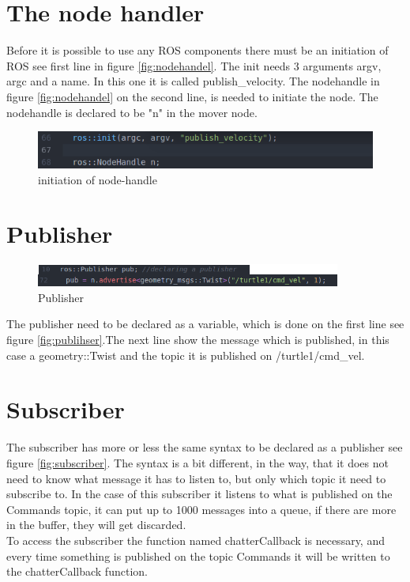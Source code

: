 \section{The node handler}
Before it is possible to use any ROS components there must be an initiation of ROS see first line in figure \ref{fig:nodehandel}. The init needs 3 arguments argv, argc and a name. In this one it is called publish\_velocity. The nodehandle in figure \ref{fig:nodehandel} on the second line, is needed to initiate the node. The nodehandle is declared to be "n" in the mover node.\\
\begin{figure}[h]
\begin{center}
\includegraphics[width=.9\textwidth]{figures/nodehandel.png}
\caption{initiation of node-handle}
\end{center}
\end{figure}\label{fig:nodehandel}


\section{Publisher}
\begin{figure}[h]
\begin{center}
\includegraphics[width=.9\textwidth]{figures/publisher.png}
\caption{Publisher}
\end{center}
\end{figure}\label{fig:publihser}
The publisher need to be declared as a variable, which is done on the first line see figure \ref{fig:publihser}.The next line show the message which is published, in this case a geometry::Twist and the topic it is published on /turtle1/cmd\_vel.\\


\section{Subscriber}
The subscriber has more or less the same syntax to be declared as a publisher see figure \ref{fig:subscriber}. The syntax is a bit different, in the way, that it does not need to know what message it has to listen to, but only which topic it need to subscribe to. In the case of this subscriber it listens to what is published on the Commands topic, it can put up to 1000 messages into a queue, if there are more in the buffer, they will get discarded.\\ 
To access the subscriber the function named chatterCallback is necessary, and every time something is published on the topic Commands it will be written to the chatterCallback function.\\

